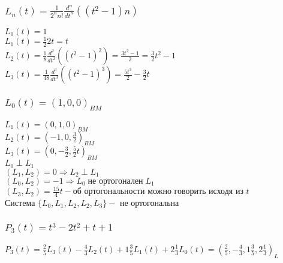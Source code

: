 \documentclass{article}
\begin{document}
    \subsubsection{$L_n (t) = \frac{1}{2^n n!} \frac{d^n}{dt^n}((t^2-1)n)$}
    $L_0 (t) = 1$\\
    $L_1 (t) = \frac{1}{2} 2t = t$\\
    $L_2 (t) = \frac{1}{8} \frac{d^2}{dt^2}((t^2-1)^2) = \frac{3t^2 - 1}{2} = \frac{3}{2} t^2 - 1$\\
    $L_3 (t) = \frac{1}{48} \frac{d^3}{dt^3}((t^2-1)^3) = \frac{5t^3}{2} - \frac{3}{2}t$\\
    \subsubsection{$L_0 (t) = (1, 0, 0)_{BM}$}
    $L_1 (t) = (0, 1, 0)_{BM}$\\
    $L_2 (t) = (-1, 0, \frac{3}{2})_{BM}$\\
    $L_3 (t) = (0, -\frac{3}{2}, \frac{5}{2}t)_{BM}$\\
    $L_0 \perp L_1$\\
    $(L_1, L_2) = 0 \Rightarrow L_2 \perp L_1$\\
    $(L_0, L_2) = -1 \Rightarrow L_0 \; \text{не ортогонален} \; L_1$\\
    $(L_3, L_2) = \frac{15}{4}t - \text{об ортогональности можно говорить исходя из } t$\\
    Система $\{L_0, L_1, L_2, L_2, L_3\} - $ не ортогональна
    \subsubsection{$P_3(t) =  t^3 - 2t^2 + t + 1$}
    $P_3 (t) = \frac{2}{5}L_3(t)- \frac{4}{3}L_2(t) + 1\frac{3}{5}L_1(t) + 2\frac{1}{3}L_0(t) = (\frac{2}{5}, -\frac{4}{3}, 1\frac{3}{5}, 2\frac{1}{3})_L$
    \subsection{}
\end{document}
